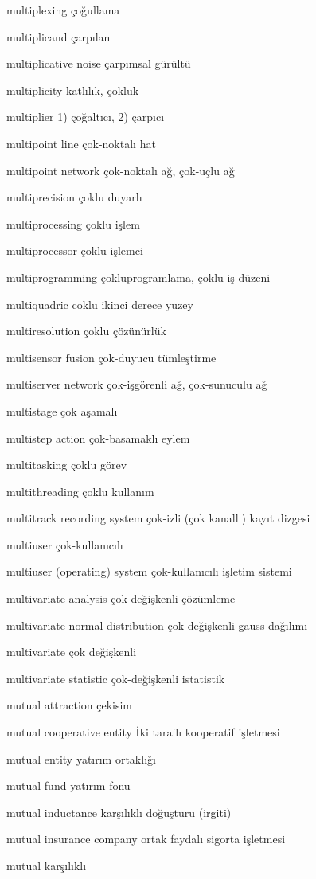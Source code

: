 \documentclass[12pt,fleqn]{article}\usepackage{../../common}
\begin{document}
multiplexing çoğullama

multiplicand çarpılan

multiplicative noise çarpımsal gürültü

multiplicity katlılık, çokluk

multiplier 1) çoğaltıcı, 2) çarpıcı

multipoint line çok-noktalı hat

multipoint network çok-noktalı ağ, çok-uçlu ağ

multiprecision çoklu duyarlı

multiprocessing çoklu işlem

multiprocessor çoklu işlemci

multiprogramming çokluprogramlama, çoklu iş düzeni

multiquadric coklu ikinci derece yuzey

multiresolution çoklu çözünürlük

multisensor fusion çok-duyucu tümleştirme

multiserver network çok-işgörenli ağ, çok-sunuculu ağ

multistage çok aşamalı

multistep action çok-basamaklı eylem

multitasking çoklu görev

multithreading çoklu kullanım

multitrack recording system çok-izli (çok kanallı) kayıt dizgesi

multiuser çok-kullanıcılı

multiuser (operating) system çok-kullanıcılı işletim sistemi

multivariate analysis çok-değişkenli çözümleme

multivariate normal distribution çok-değişkenli gauss dağılımı

multivariate çok değişkenli

multivariate statistic çok-değişkenli istatistik

mutual attraction çekisim

mutual cooperative entity İki taraflı kooperatif işletmesi

mutual entity yatırım ortaklığı

mutual fund yatırım fonu

mutual inductance karşılıklı doğuşturu (irgiti)

mutual insurance company ortak faydalı sigorta işletmesi

mutual karşılıklı
\end{document}
